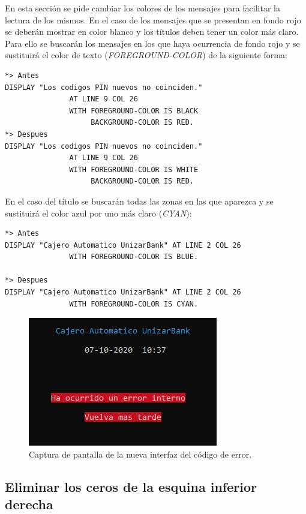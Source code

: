 \documentclass[10pt,a4paper]{article}
\begin{document}
En esta sección se pide cambiar los colores de los mensajes para facilitar la lectura de los mismos. En el caso de los mensajes que se presentan en fondo rojo se deberán mostrar en color blanco y los títulos deben tener un color más claro.\\

Para ello se buscarán los mensajes en los que haya ocurrencia de fondo rojo y se sustituirá el color de texto (\emph{FOREGROUND-COLOR}) de la siguiente forma:

\begin{lstlisting}
*> Antes
DISPLAY "Los codigos PIN nuevos no coinciden." 
               AT LINE 9 COL 26
               WITH FOREGROUND-COLOR IS BLACK
                    BACKGROUND-COLOR IS RED.
*> Despues
DISPLAY "Los codigos PIN nuevos no coinciden." 
               AT LINE 9 COL 26
               WITH FOREGROUND-COLOR IS WHITE
                    BACKGROUND-COLOR IS RED.
\end{lstlisting}

En el caso del título se buscarán todas las zonas en las que aparezca y se sustituirá el color azul por uno más claro (\emph{CYAN}):

\begin{lstlisting}
*> Antes
DISPLAY "Cajero Automatico UnizarBank" AT LINE 2 COL 26
               WITH FOREGROUND-COLOR IS BLUE.

*> Despues
DISPLAY "Cajero Automatico UnizarBank" AT LINE 2 COL 26
               WITH FOREGROUND-COLOR IS CYAN.
\end{lstlisting}


\begin{figure}[h!]
\centering
\includegraphics[scale=0.75]{images/error.png}
\caption{Captura de pantalla de la nueva interfaz del código de error.}
\label{fig:error}
\end{figure}

\subsection{Eliminar los ceros de la esquina inferior derecha}
\end{document}
